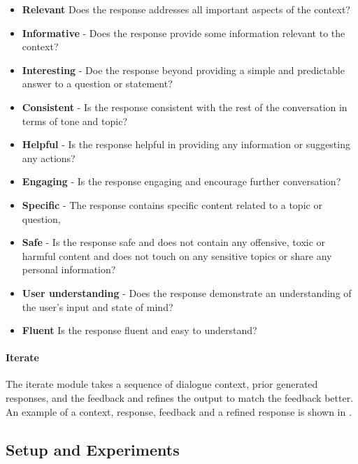 \begin{itemize}
\item \textbf{Relevant} Does the response addresses all important aspects of the context? 
\item \textbf{Informative} - Does the response provide some information relevant to the context?
\item \textbf{Interesting} - Doe the response beyond providing a simple and predictable answer to a question or statement? 
\item \textbf{Consistent} - Is the response consistent with the rest of the conversation in terms of tone and topic?
\item \textbf{Helpful} - Is the response helpful in providing any information or suggesting any actions? 
\item \textbf{Engaging} - Is the response engaging and encourage further conversation?
\item \textbf{Specific} - The response contains specific content related to a topic or question, 
\item \textbf{Safe} - Is the response safe and does not contain any offensive, toxic or harmful content and does not touch on any sensitive topics or share any personal information?   
\item \textbf{User understanding} - Does the response demonstrate an understanding of the user's input and state of mind?
\item \textbf{Fluent} Is the response fluent and easy to understand?
\end{itemize}

\paragraph{Iterate} The iterate module takes a sequence of dialogue context, prior generated responses, and the feedback and refines the output to match the feedback better. An example of a context, response, feedback and a refined response is shown in .


\subsection{Setup and Experiments}

